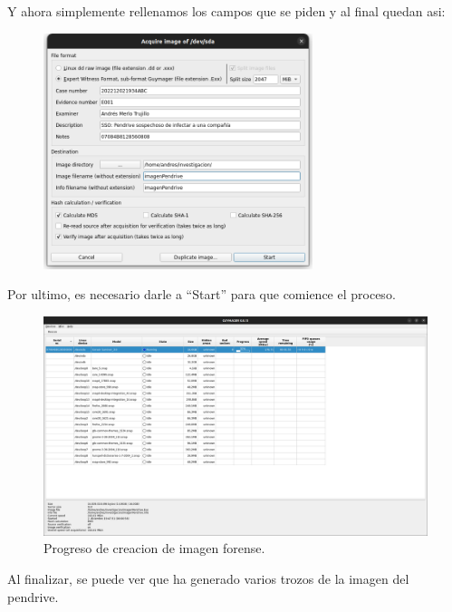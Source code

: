 \documentclass{article}
\begin{document}
Y ahora simplemente rellenamos los campos que se piden y al final quedan asi:

\begin{figure}[H]
    \centering
    \includegraphics[width=0.7\textwidth]{imagenes/Captura desde 2022-12-02 19-36-04.png}
\end{figure}

Por ultimo, es necesario darle a ``Start'' para que comience el proceso.

\begin{figure}[H]
    \centering
    \includegraphics[width=\textwidth]{imagenes/Captura desde 2022-12-02 19-48-29.png}
    \caption{Progreso de creacion de imagen forense.}
\end{figure}

Al finalizar, se puede ver que ha generado varios trozos de la imagen del pendrive.
\end{document}
